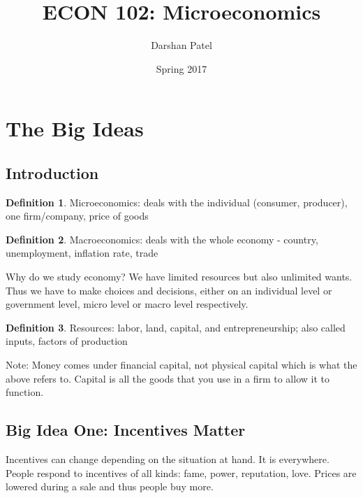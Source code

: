 \documentclass[12pt]{article}
\begin{document}
\theoremstyle{definition}
\newtheorem{definition}{Definition}[section]
\newtheorem{formula}{Formula}[section]

\title{ECON 102: Microeconomics}
\author{Darshan Patel}
\date{Spring 2017}
\maketitle

\tableofcontents





\section{The Big Ideas}
\subsection{Introduction} 
\begin{definition} Microeconomics: deals with the individual (consumer, producer), one firm/company, price of goods \end{definition}
\begin{definition} Macroeconomics: deals with the whole economy - country, unemployment, inflation rate, trade \end{definition}
Why do we study economy? We have limited resources but also unlimited wants. Thus we have to make choices and decisions, either on an individual level or government level, micro level or macro level respectively. 
\begin{definition} Resources: labor, land, capital, and entrepreneurship; also called inputs, factors of production \end{definition} 
Note: Money comes under financial capital, not physical capital which is what the above refers to. Capital is all the goods that you use in a firm to allow it to function. 

\subsection{Big Idea One: Incentives Matter} 
Incentives can change depending on the situation at hand. It is everywhere. People respond to incentives of all kinds: fame, power, reputation, love. Prices are lowered during a sale and thus people buy more. 
\end{document}
